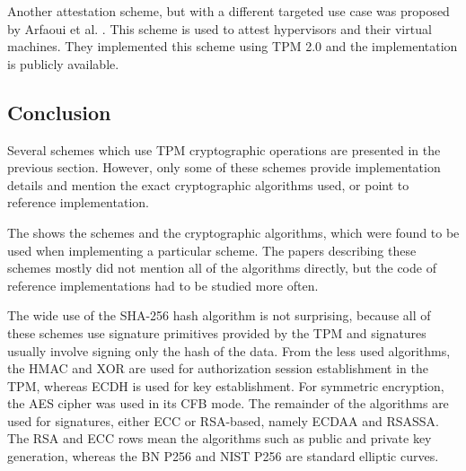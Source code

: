 Another attestation scheme, but with a different targeted use case was proposed by Arfaoui et al. \cite{arfaoui2021deepAttestation}. This scheme is used to attest hypervisors and their virtual machines. They implemented this scheme using TPM 2.0 and the implementation is publicly available. 


\subsection{Conclusion}
Several schemes which use TPM cryptographic operations are presented in the previous section. However, only some of these schemes provide implementation details and mention the exact cryptographic algorithms used, or point to reference implementation. 

The  shows the schemes and the cryptographic algorithms, which were found to be used when implementing a particular scheme. The papers describing these schemes mostly did not mention all of the algorithms directly, but the code of reference implementations had to be studied more often.

The wide use of the SHA-256 hash algorithm is not surprising, because all of these schemes use signature primitives provided by the TPM and signatures usually involve signing only the hash of the data. From the less used algorithms, the HMAC and XOR are used for authorization session establishment in the TPM, whereas ECDH is used for key establishment. For symmetric encryption, the AES cipher was used in its CFB mode. The remainder of the algorithms are used for signatures, either ECC or RSA-based, namely ECDAA and RSASSA. The RSA and ECC rows mean the algorithms such as public and private key generation, whereas the BN P256 and NIST P256 are standard elliptic curves.


